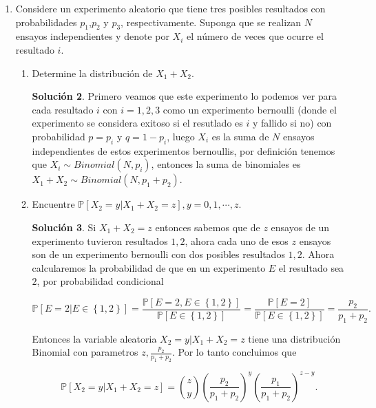 \documentclass[letterpaper]{article}
\theoremstyle{definition}
\theoremstyle{lemathm}
\theoremstyle{lemathm}
\newtheorem{sol}{Solución}
\theoremstyle{lemathm}
\theoremstyle{lemademthm}
\newcommand{\pars}[1]{\left( #1 \right) }
\newcommand{\bracs}[1]{\left[ #1 \right] }
\newcommand{\set}[1]{\left \{ #1 \right\} }
\newcommand{\PP}{\mathbb{P}}
\newcommand{\1}{\mathbbm{1}}
\begin{document}
\begin{enumerate}
\begin{sol}

			Por lo tanto concluimos que la función de distirbución conjunta de $X_1,\cdots,X_N$ es

			\[f_{x_1,\cdots,X_n}(x_1,\cdots,x_N) = \begin{cases}
				\frac{1}{\binom{3N-1}{N-1}} & x_1+\cdots+x_N = 2N\\
				0 & \text{en otro caso}.
			\end{cases}\]
		\end{sol}
		
		\item Considere un experimento aleatorio que tiene tres posibles resultados con probabilidades $p_1$,$p_2$ y $p_3$, respectivamente. Suponga que se realizan $N$ ensayos independientes y denote por $X_i$ el número de veces que ocurre el resultado $i$.
		
		\begin{enumerate}
			\item Determine la distribución de $X_1+X_2$.
			
			\begin{sol}

				Primero veamos que este experimento lo podemos ver para cada resultado $i$ con $i = 1,2,3$ como un experimento bernoulli (donde el experimento se considera exitoso si el resutlado es $i$ y fallido si no) con probabilidad $p = p_i$ y $q = 1 - p_i$, luego $X_i$ es la suma de $N$ ensayos independientes de estos experimentos bernoullis, por definición tenemos que $X_i\sim Binomial(N,p_i)$, entonces la suma de binomiales es $X_1+X_2\sim Binomial(N,p_1+p_2)$.

			\end{sol}

			\item Encuentre $\PP\bracs{X_2 = y | X_1+X_2=z}, y = 0,1,\cdots,z$.
			
			\begin{sol}
				
				Si $X_1+X_2=z$ entonces sabemos que de $z$ ensayos de un experimento tuvieron resultados $1,2$, ahora cada uno de esos $z$ ensayos son de un experimento bernoulli con dos posibles resultados $1,2$. Ahora calcularemos la probabilidad de que en un experimento $E$ el resultado sea $2$, por probabilidad condicional

				\[\PP\bracs{E=2 | E\in\set{1,2}} = \frac{\PP[E=2,E\in\set{1,2}]}{\PP\bracs{E\in\set{1,2}}} = \frac{\PP\bracs{E=2}}{\PP\bracs{E\in\set{1,2}}} = \frac{p_2}{p_1+p_2}.\]

				Entonces la variable aleatoria $X_2 = y | X_1+X_2=z$ tiene una distribución Binomial con parametros $z, \frac{p_2}{p_1+p_2}$. Por lo tanto concluimos que

				\[\PP\bracs{X_2 = y | X_1+X_2=z} = \binom{z}{y} \pars{\frac{p_2}{p_1+p_2}}^{y}\pars{\frac{p_1}{p_1+p_2}}^{z-y}.\]

			\end{sol}

		\end{enumerate}
	\end{enumerate}
\end{document}
